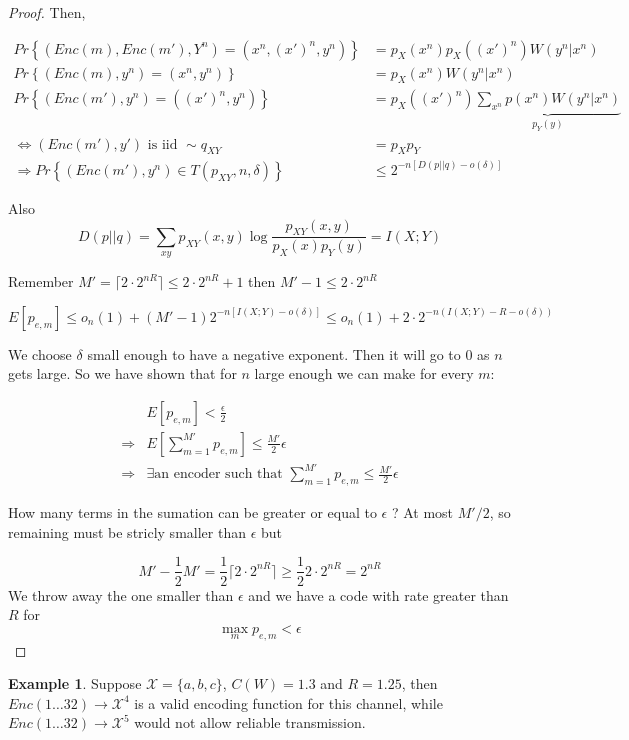 \documentclass[twoside]{article}
\theoremstyle{definition} %
\newtheorem{example}{Example}
\renewcommand{\Pr}[1]{Pr\left\{#1\right\}}
\newcommand{\Ex}[1]{E\left[#1\right]}
\def\X{\mathcal{X}}
\begin{document}
\begin{proof}
Then,

\begin{align*}
  \Pr{(Enc(m), Enc(m'), Y^n) = (x^n, (x')^n, y^n)} &= p_X(x^n) p_X((x')^n)W(y^n|x^n)\\
  \Pr{(Enc(m), y^n) = (x^n, y^n)} &= p_X(x^n)W(y^n|x^n)\\
  \Pr{(Enc(m'), y^n) = ((x')^n, y^n)} &= p_X((x')^n) \underbrace{\sum_{x^n} p(x^n)W(y^n|x^n)}_{p_Y(y)}\\
  \iff (Enc(m'), y') \text{ is iid } \sim q_{XY} &= p_Xp_Y\\
  \Rightarrow \Pr{(Enc(m'), y^n) \in T(p_{XY}, n, \delta)} &\leq 2^{-n[D(p||q)- o(\delta)]}
\end{align*}

Also
\[
  D(p||q) = \sum_{xy} p_{XY}(x,y) \log \frac {p_{XY}(x,y)} {p_X(x) p_Y(y)} = I(X;Y)
\]


Remember $M' = \lceil2 \cdot 2^{nR} \rceil \leq 2 \cdot 2^{nR} + 1$ then $M'-1 \leq 2 \cdot 2^{nR}$

\[
  \Ex{p_{e,m}} \leq o_n(1) + (M' -1)  2^{-n[I(X;Y)- o(\delta)]}
  \leq o_n(1) + 2 \cdot 2^{-n(I(X;Y) - R - o(\delta))}
\]

We choose $\delta$ small enough to have a negative exponent. Then it will go to 0 as $n$ gets large. So we have shown that for $n $ large enough we can make for every $m$:

\begin{align*}
  &\Ex{p_{e,m}} < \frac \epsilon 2\\
  \Rightarrow& \Ex{\sum_{m=1}^{M'} p_{e,m}} \leq \frac{M'} 2 \epsilon\\
  \Rightarrow& \exists \text{an encoder such that } \sum_{m=1}^{M'} p_{e,m} \leq \frac{M'} 2 \epsilon
\end{align*}

How many terms in the sumation can be greater or equal to $\epsilon$ ? At most $M'/2$, so remaining must be stricly smaller than $\epsilon$ but

\[
  M' - \frac 1 2 M' = \frac 1 2 \lceil 2 \cdot 2^{nR} \rceil \geq \frac 1 2 2 \cdot 2^{nR} = 2^{nR}
\]
We throw away the one smaller than $\epsilon$ and we have a code with rate greater than $R$ for
\[
  \max_m p_{e,m} < \epsilon
\]
\end{proof}

\begin{example}
  Suppose $\X = \{a,b,c\}$, $C(W)=1.3$ and $R=1.25$, then $Enc(1 \dots 32) \to \X^4$ is a valid encoding function for this channel, while $Enc(1 \dots 32) \to \X^5$ would not allow reliable transmission.
\end{example}
\end{document}
